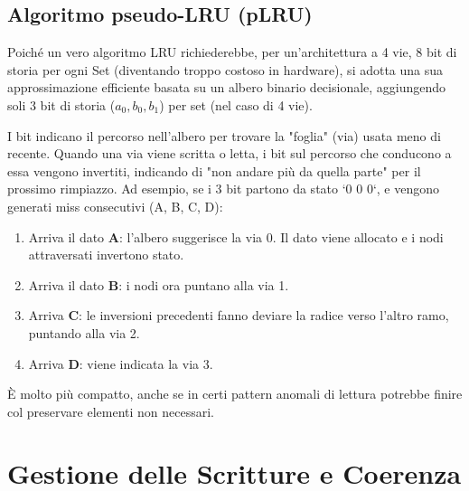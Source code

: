 \subsection{Algoritmo pseudo-LRU (pLRU)}
Poiché un vero algoritmo LRU richiederebbe, per un'architettura a 4 vie, 8 bit di storia per ogni Set (diventando troppo costoso in hardware), si adotta una sua approssimazione efficiente basata su un albero binario decisionale, aggiungendo soli 3 bit di storia ($a_0, b_0, b_1$) per set (nel caso di 4 vie).


I bit indicano il percorso nell'albero per trovare la "foglia" (via) usata meno di recente. Quando una via viene scritta o letta, i bit sul percorso che conducono a essa vengono invertiti, indicando di "non andare più da quella parte" per il prossimo rimpiazzo.
Ad esempio, se i 3 bit partono da stato `0 0 0`, e vengono generati miss consecutivi (A, B, C, D):
\begin{enumerate}
    \item Arriva il dato \textbf{A}: l'albero suggerisce la via 0. Il dato viene allocato e i nodi attraversati invertono stato.
    \item Arriva il dato \textbf{B}: i nodi ora puntano alla via 1.
    \item Arriva \textbf{C}: le inversioni precedenti fanno deviare la radice verso l'altro ramo, puntando alla via 2.
    \item Arriva \textbf{D}: viene indicata la via 3.
\end{enumerate}
È molto più compatto, anche se in certi pattern anomali di lettura potrebbe finire col preservare elementi non necessari.

\section{Gestione delle Scritture e Coerenza}

